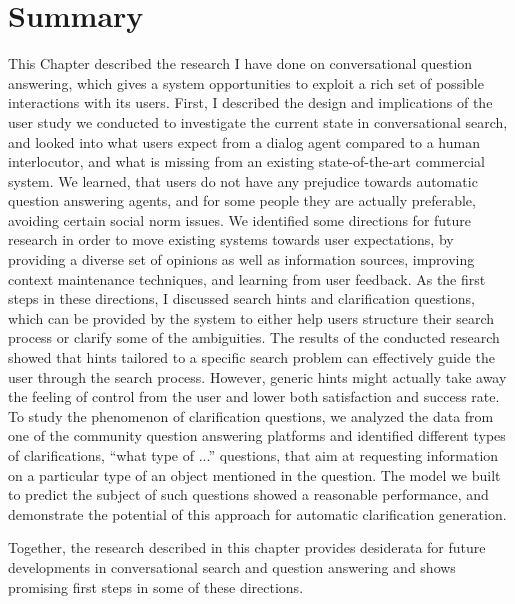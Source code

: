 
\section{Summary}
\label{section:conversation:summary}

This Chapter described the research I have done on conversational question answering, which gives a system opportunities to exploit a rich set of possible interactions with its users.
First, I described the design and implications of the user study we conducted to investigate the current state in conversational search, and looked into what users expect from a dialog agent compared to a human interlocutor, and what is missing from an existing state-of-the-art commercial system.
We learned, that users do not have any prejudice towards automatic question answering agents, and for some people they are actually preferable, avoiding certain social norm issues.
We identified some directions for future research in order to move existing systems towards user expectations, by providing a diverse set of opinions as well as information sources, improving context maintenance techniques, and learning from user feedback.
As the first steps in these directions, I discussed search hints and clarification questions, which can be provided by the system to either help users structure their search process or clarify some of the ambiguities.
The results of the conducted research showed that hints tailored to a specific search problem can effectively guide the user through the search process.
However, generic hints might actually take away the feeling of control from the user and lower both satisfaction and success rate.
To study the phenomenon of clarification questions, we analyzed the data from one of the community question answering platforms and identified different types of clarifications, \eg ``what type of ...'' questions, that aim at requesting information on a particular type of an object mentioned in the question.
The model we built to predict the subject of such questions showed a reasonable performance, and demonstrate the potential of this approach for automatic clarification generation.

Together, the research described in this chapter provides desiderata for future developments in conversational search and question answering and shows promising first steps in some of these directions.